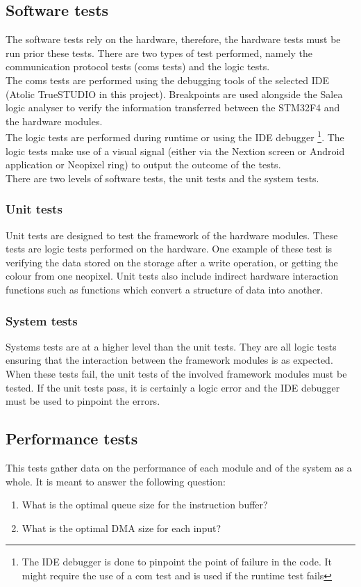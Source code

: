 \subsection{Software tests}
The software tests rely on the hardware, therefore, the hardware tests must be run prior these tests. There are two types of test performed, namely the communication protocol tests (coms tests) and the logic tests.\\
The coms tests are performed using the debugging tools of the selected IDE (Atolic TrueSTUDIO in this project). Breakpoints are used alongside the Salea logic analyser to verify the information transferred between the STM32F4 and the hardware modules.\\
The logic tests are performed during runtime or using the IDE debugger \footnote{The IDE debugger is done to pinpoint the point of failure in the code. It might require the use of a com test and is used if the runtime test fails}. The logic tests make use of a visual signal (either via the Nextion screen or Android application or Neopixel ring) to output the outcome of the tests.\\
There are two levels of software tests, the unit tests and the system tests.
\subsubsection{Unit tests}
Unit tests are designed to test the framework of the hardware modules. These tests are logic tests performed on the hardware. One example of these test is verifying the data stored on the storage after a write operation, or getting the colour from one neopixel. Unit tests also include indirect hardware interaction functions such as functions which convert a structure of data into another. 
\subsubsection{System tests}
Systems tests are at a higher level than the unit tests. They are all logic tests ensuring that the interaction between the framework modules is as expected. When these tests fail, the unit tests of the involved framework modules must be tested. If the unit tests pass, it is certainly a logic error and the IDE debugger must be used to pinpoint the errors.

\subsection{Performance tests}
This tests gather data on the performance of each module and of the system as a whole. It is meant to answer the following question:
\begin{enumerate}
\item What is the optimal queue size for the instruction buffer?
\item What is the optimal DMA size for each input? 
\end{enumerate} 
